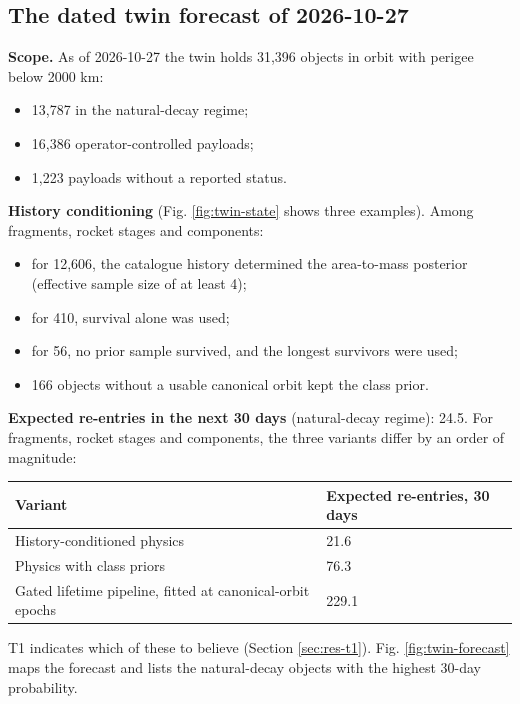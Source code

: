 \documentclass[
]{article}
\newcounter{none} %
\providecommand{\tightlist}{%
  \setlength{\itemsep}{0pt}\setlength{\parskip}{0pt}}
\begin{document}
\subsection{The dated twin forecast of 2026-10-27}\label{sec:res-twin}

\textbf{Scope.} As of 2026-10-27 the twin holds 31,396 objects in orbit
with perigee below 2000 km:

\begin{itemize}
\tightlist
\item
  13,787 in the natural-decay regime;
\item
  16,386 operator-controlled payloads;
\item
  1,223 payloads without a reported status.
\end{itemize}

\textbf{History conditioning} (Fig. \ref{fig:twin-state} shows three
examples). Among fragments, rocket stages and components:

\begin{itemize}
\tightlist
\item
  for 12,606, the catalogue history determined the area-to-mass
  posterior (effective sample size of at least 4);
\item
  for 410, survival alone was used;
\item
  for 56, no prior sample survived, and the longest survivors were used;
\item
  166 objects without a usable canonical orbit kept the class prior.
\end{itemize}

\textbf{Expected re-entries in the next 30 days} (natural-decay regime):
24.5. For fragments, rocket stages and components, the three variants
differ by an order of magnitude:

{\def\LTcaptype{none} %
\begin{longtable}[]{@{}ll@{}}
\toprule\noalign{}
Variant & Expected re-entries, 30 days \\
\midrule\noalign{}
\endhead
\bottomrule\noalign{}
\endlastfoot
History-conditioned physics & 21.6 \\
Physics with class priors & 76.3 \\
Gated lifetime pipeline, fitted at canonical-orbit epochs & 229.1 \\
\end{longtable}
}

T1 indicates which of these to believe (Section \ref{sec:res-t1}). Fig.
\ref{fig:twin-forecast} maps the forecast and lists the natural-decay
objects with the highest 30-day probability.
\end{document}
